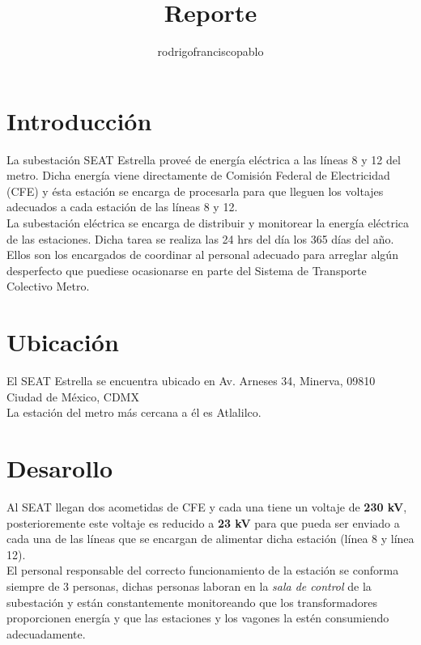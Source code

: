 \documentclass{mylib/reporte}
\title{Reporte}
\author{rodrigofranciscopablo }
\begin{document}
\coverPage

\tableofcontents
\newpage

\section{Introducción}

La subestación SEAT Estrella proveé de energía eléctrica a las líneas 8 y 12 del metro. Dicha energía viene directamente de Comisión Federal de Electricidad (CFE) y ésta estación se encarga de procesarla para que lleguen los voltajes adecuados a cada estación de las líneas 8 y 12.\\

La subestación eléctrica se encarga de distribuir y monitorear la energía eléctrica de las estaciones. Dicha tarea se realiza las 24 hrs del día los 365 días del año. Ellos son los encargados de coordinar al personal adecuado para arreglar algún desperfecto que puediese ocasionarse en parte del Sistema de Transporte Colectivo Metro.

\section{Ubicación}

El SEAT Estrella se encuentra ubicado en Av. Arneses 34, Minerva, 09810 Ciudad de México, CDMX\\

La estación del metro más cercana a él es Atlalilco.


\section{Desarollo}

Al SEAT llegan dos acometidas de CFE y cada una tiene un voltaje de  \textbf{230 kV}, posterioremente este voltaje es reducido a \textbf{23 kV} para que pueda ser enviado a cada una de las líneas que se encargan de alimentar dicha estación (línea 8 y línea 12).\\

El personal responsable del correcto funcionamiento de la estación se conforma siempre de 3 personas, dichas personas laboran en la \textit{sala de control} de la subestación y están constantemente monitoreando que los transformadores proporcionen energía y que las estaciones y los vagones la estén consumiendo adecuadamente.\\
\end{document}
